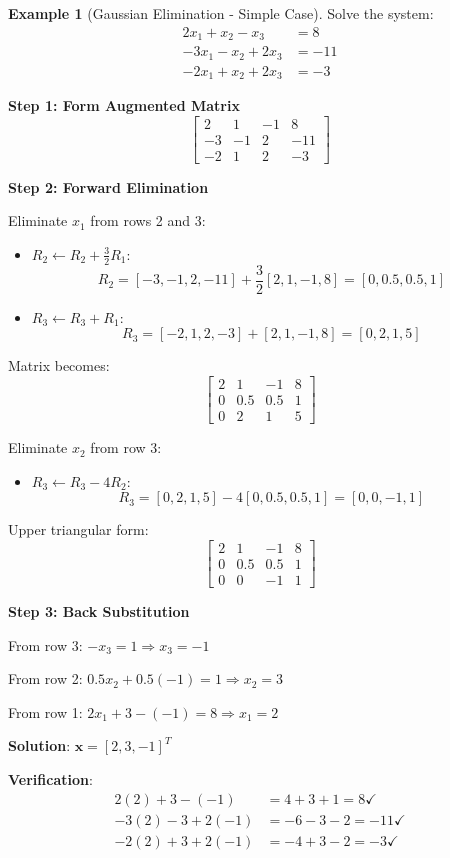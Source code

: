 \documentclass[12pt,a4paper]{article}
\theoremstyle{definition}
\newtheorem{example}{Example}[section]
\begin{document}
\begin{example}[Gaussian Elimination - Simple Case]
Solve the system:
\begin{align*}
2x_1 + x_2 - x_3 &= 8 \\
-3x_1 - x_2 + 2x_3 &= -11 \\
-2x_1 + x_2 + 2x_3 &= -3
\end{align*}

\textbf{Step 1: Form Augmented Matrix}
\[
\left[\begin{array}{ccc|c}
2 & 1 & -1 & 8 \\
-3 & -1 & 2 & -11 \\
-2 & 1 & 2 & -3
\end{array}\right]
\]

\textbf{Step 2: Forward Elimination}

Eliminate $x_1$ from rows 2 and 3:
\begin{itemize}
\item $R_2 \leftarrow R_2 + \frac{3}{2}R_1$:
\[
R_2 = [-3, -1, 2, -11] + \frac{3}{2}[2, 1, -1, 8] = [0, 0.5, 0.5, 1]
\]

\item $R_3 \leftarrow R_3 + R_1$:
\[
R_3 = [-2, 1, 2, -3] + [2, 1, -1, 8] = [0, 2, 1, 5]
\]
\end{itemize}

Matrix becomes:
\[
\left[\begin{array}{ccc|c}
2 & 1 & -1 & 8 \\
0 & 0.5 & 0.5 & 1 \\
0 & 2 & 1 & 5
\end{array}\right]
\]

Eliminate $x_2$ from row 3:
\begin{itemize}
\item $R_3 \leftarrow R_3 - 4R_2$:
\[
R_3 = [0, 2, 1, 5] - 4[0, 0.5, 0.5, 1] = [0, 0, -1, 1]
\]
\end{itemize}

Upper triangular form:
\[
\left[\begin{array}{ccc|c}
2 & 1 & -1 & 8 \\
0 & 0.5 & 0.5 & 1 \\
0 & 0 & -1 & 1
\end{array}\right]
\]

\textbf{Step 3: Back Substitution}

From row 3: $-x_3 = 1 \Rightarrow x_3 = -1$

From row 2: $0.5x_2 + 0.5(-1) = 1 \Rightarrow x_2 = 3$

From row 1: $2x_1 + 3 - (-1) = 8 \Rightarrow x_1 = 2$

\textbf{Solution}: $\mathbf{x} = [2, 3, -1]^T$

\textbf{Verification}:
\begin{align*}
2(2) + 3 - (-1) &= 4 + 3 + 1 = 8 \checkmark \\
-3(2) - 3 + 2(-1) &= -6 - 3 - 2 = -11 \checkmark \\
-2(2) + 3 + 2(-1) &= -4 + 3 - 2 = -3 \checkmark
\end{align*}
\end{example}
\end{document}

